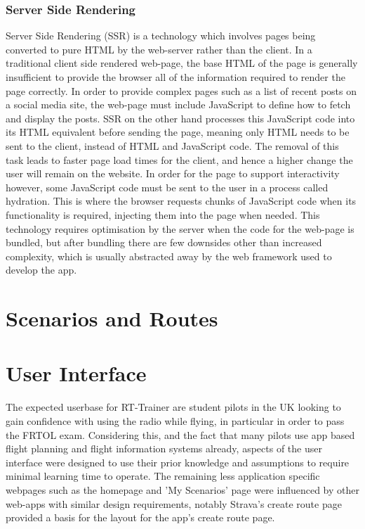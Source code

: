 \subsubsection{Server Side Rendering}
Server Side Rendering (SSR) is a technology which involves pages being converted to pure HTML by the web-server rather than the client. In a traditional client side rendered web-page, the base HTML of the page is generally insufficient to provide the browser all of the information required to render the page correctly. In order to provide complex pages such as a list of recent posts on a social media site, the web-page must include JavaScript to define how to fetch and display the posts. SSR on the other hand processes this JavaScript code into its HTML equivalent before sending the page, meaning only HTML needs to be sent to the client, instead of HTML and JavaScript code\cite{}. The removal of this task leads to faster page load times for the client, and hence a higher change the user will remain on the website\cite{}. In order for the page to support interactivity however, some JavaScript code must be sent to the user in a process called hydration. This is where the browser requests chunks of JavaScript code when its functionality is required, injecting them into the page when needed. This technology requires optimisation by the server when the code for the web-page is bundled, but after bundling there are few downsides other than increased complexity, which is usually abstracted away by the web framework used to develop the app.


\section{Scenarios and Routes}

\section{User Interface}

The expected userbase for RT-Trainer are student pilots in the UK looking to gain confidence with using the radio while flying, in particular in order to pass the FRTOL exam. Considering this, and the fact that many pilots use app based flight planning and flight information systems already, aspects of the user interface were designed to use their prior knowledge and assumptions to require minimal learning time to operate. The remaining less application specific webpages such as the homepage and 'My Scenarios' page were influenced by other web-apps with similar design requirements, notably Strava's create route page provided a basis for the layout for the app's create route page.


